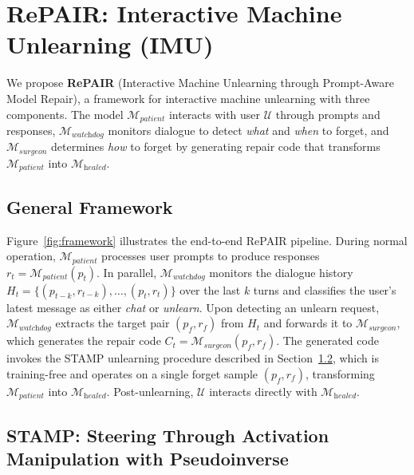 \section{RePAIR: Interactive Machine Unlearning (IMU)}\label{sec:repair_method}

We propose \textbf{RePAIR} (Interactive Machine Unlearning through Prompt-Aware Model Repair), a framework for interactive machine unlearning with three components. The model $\mathcal{M}_{\textit{patient}}$ interacts with user $\mathcal{U}$ through prompts and responses, $\mathcal{M}_{\textit{watchdog}}$ monitors dialogue to detect \textit{what} and \textit{when} to forget, and $\mathcal{M}_{\textit{surgeon}}$ determines \textit{how} to forget by generating repair code that transforms $\mathcal{M}_{\textit{patient}}$ into $\mathcal{M}_{\textit{healed}}$.

\subsection{General Framework}\label{subsec:rp_framework}

Figure~\ref{fig:framework} illustrates the end-to-end RePAIR pipeline. During normal operation, $\mathcal{M}_{\textit{patient}}$ processes user prompts to produce responses $r_t = \mathcal{M}_{\textit{patient}}(p_t)$. In parallel, $\mathcal{M}_{\textit{watchdog}}$ monitors the dialogue history $H_t = \{(p_{t-k}, r_{t-k}), \ldots, (p_t, r_t)\}$ over the last $k$ turns and classifies the user's latest message as either \textit{chat} or \textit{unlearn}. Upon detecting an unlearn request, $\mathcal{M}_{\textit{watchdog}}$ extracts the target pair $(p_f, r_f)$ from $H_t$ and forwards it to $\mathcal{M}_{\textit{surgeon}}$, which generates the repair code $C_t = \mathcal{M}_{\textit{surgeon}}(p_f, r_f)$. The generated code invokes the STAMP unlearning procedure described in Section~\ref{subsec:rp_stamp}, which is training-free and operates on a single forget sample $(p_f, r_f)$, transforming $\mathcal{M}_{\textit{patient}}$ into $\mathcal{M}_{\textit{healed}}$. Post-unlearning, $\mathcal{U}$ interacts directly with $\mathcal{M}_{\textit{healed}}$.

\subsection{STAMP: Steering Through Activation Manipulation with Pseudoinverse}\label{subsec:rp_stamp}

